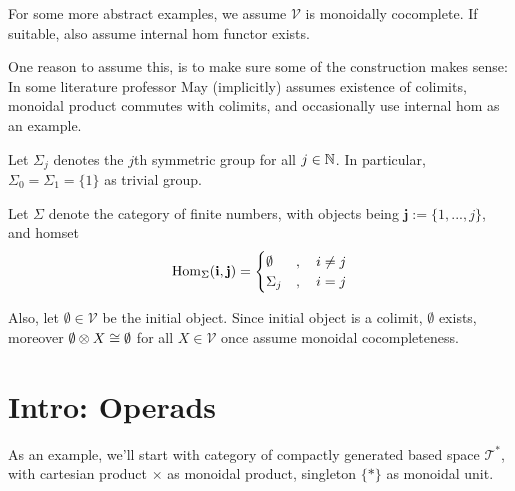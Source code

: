\documentclass{article}
\begin{document}
\begin{rem}
    For some more abstract examples, we assume $\mathcal{V}$ is monoidally cocomplete. If suitable, also assume internal hom functor exists.

    One reason to assume this, is to make sure some of the construction makes sense: In some literature professor May (implicitly) assumes existence of colimits, monoidal product commutes with colimits, and occasionally use internal hom as an example.
\end{rem}

\hfil

\begin{notn}
Let $\Sigma_j$ denotes the $j$th symmetric group for all $j\in\mathbb{N}$. In particular, $\Sigma_0=\Sigma_1=\{1\}$ as trivial group.

Let $\Sigma$ denote the category of finite numbers, with objects being $\mathbf{j}:=\{1,...,j\}$, and homset 
\[\mathrm{Hom}_\Sigma(\mathbf{i},\mathbf{j})=\begin{cases}
    \emptyset &,\quad i\neq j\\
    \Sigma_j &,\quad i=j
\end{cases}\]

Also, let $\emptyset\in\mathcal{V}$ be the initial object. Since initial object is a colimit, $\emptyset$ exists, moreover $\emptyset \otimes X\cong \emptyset$ for all $X\in\mathcal{V}$ once assume monoidal cocompleteness.
\end{notn}

\newpage

\section{Intro: Operads}

As an example, we'll start with category of compactly generated based space $\mathcal{T}^*$, with cartesian product $\times$ as monoidal product, singleton $\{*\}$ as monoidal unit.
\end{document}
